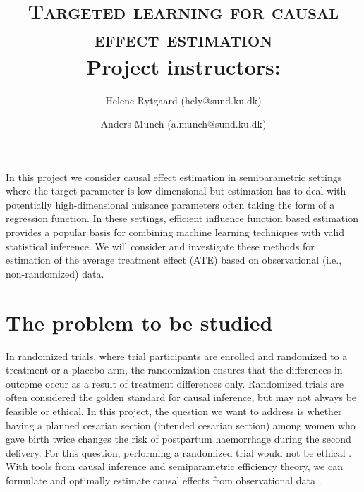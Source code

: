 \documentclass{article}
\title{\textsc{Targeted learning for causal effect estimation} \\[0.5em]
\large Project instructors:\\[-0.8em]}
\author[1]{\normalsize Helene Rytgaard (hely@sund.ku.dk) }
\author[1]{Anders Munch (a.munch@sund.ku.dk)}
\affil[1]{Section of Biostatistics, University of Copenhagen}
\date{}                     %
\newcommand{\1}{\mathbb{1}}
\begin{document}
\maketitle








In this project we consider causal effect estimation in semiparametric
settings where the target parameter is low-dimensional but estimation
has to deal with potentially high-dimensional nuisance parameters
often taking the form of a regression function. In these settings,
efficient influence function based estimation provides a popular basis
for combining machine learning techniques with valid statistical
inference. We will consider and investigate these methods for
estimation of the average treatment effect (ATE) based on
observational (i.e., non-randomized) data.


\section{The problem to be studied}


In randomized trials, where trial participants are enrolled and
randomized to a treatment or a placebo arm, the randomization ensures
that the differences in outcome occur as a result of treatment
differences only. Randomized trials are often considered the golden
standard for causal inference, but may not always be feasible or
ethical. In this project, the question we want to address is whether
having a planned cesarian section (intended cesarian section) among
women who gave birth twice changes the risk of postpartum haemorrhage
during the second delivery. For this question, performing a randomized
trial would not be ethical%
. With tools from
causal inference and semiparametric efficiency theory, we can
formulate and optimally estimate causal effects from observational
data%
. \\
\end{document}
